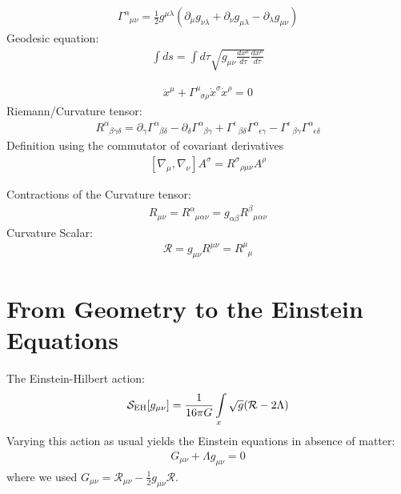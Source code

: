  
\begin{align}
\Gamma_{\phantom{\alpha}\mu \nu}^{\alpha}=\frac{1}{2} g^{\mu \lambda}\left(\partial_{\mu} g_{\nu \lambda}+\partial_{\nu} g_{\mu \lambda}-\partial_{\lambda} g_{\mu \nu}\right)	
\end{align}
Geodesic equation:
\begin{align}
	\int d s=\int d \tau \sqrt{g_{\mu \nu} \frac{d x^{\mu}}{d \tau} \frac{d x^{\mu}}{d \tau}}
\end{align}

\begin{align}
	\ddot{x}^{\mu}+\Gamma_{\phantom{\mu}\sigma \rho}^{\mu} \dot{x}^{\sigma} \dot{x}^{\rho}=0
\end{align}
Riemann/Curvature tensor:
\begin{align}
	R_{\phantom{\alpha}\beta \gamma \delta}^{\alpha}=\partial_{\gamma} \Gamma_{\phantom{\alpha}\beta \delta}^{\alpha}-\partial_{\delta} \Gamma_{\phantom{\alpha}\beta \gamma}^{\alpha}+\Gamma_{\phantom{\alpha}\beta \delta}^{\epsilon} \Gamma_{\phantom{\alpha}\epsilon \gamma}^{\alpha}-\Gamma_{\phantom{\alpha}\beta \gamma}^{\epsilon} \Gamma_{\phantom{\alpha}\epsilon \delta}^{\alpha}
\end{align}
Definition using the commutator of covariant derivatives
\begin{align}
	\left[\nabla_{\mu}, \nabla_{\nu}\right] A^{\sigma}=R_{\phantom{\alpha}\rho \mu \nu}^{\sigma} A^{\rho} \label{eqn:Riemann}
\end{align}

Contractions of the Curvature tensor:
\begin{align}
	R_{\mu\nu} = R^{\alpha}_{\phantom{\alpha}\mu\alpha\nu} = g_{\alpha\beta} R^{\beta}_{\phantom{\alpha}\mu\alpha\nu}
\end{align}
Curvature Scalar:
\begin{align}
\mathcal{R} = g_{\mu\nu}R^{\mu\nu} = R^{\mu}_{\phantom{\mu}\mu}
\end{align}






\section{From Geometry to the Einstein Equations}


The Einstein-Hilbert action:
\begin{align}
	\mathcal{S}_{\text{EH}}[g_{\mu\nu}] = \frac{1}{16\pi G} \int\limits_x \sqrt{g} (\mathcal{R} - 2\Lambda)
\end{align}
Varying this action as usual yields the Einstein equations in absence of matter:
\begin{align}
	G_{\mu\nu} + \Lambda g_{\mu\nu} = 0
\end{align}
where we used $G_{\mu\nu} = \mathcal{R}_{\mu\nu} - \frac{1}{2}g_{\mu\nu}\mathcal{R}$. \\

